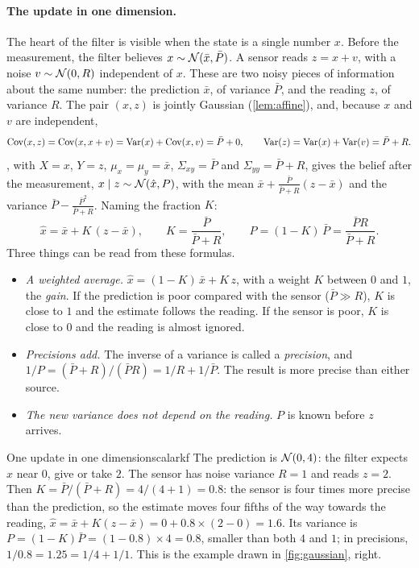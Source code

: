 \paragraph{The update in one dimension.} The heart of the filter is
visible when the state is a single number $x$. Before the measurement,
the filter believes $x\sim\mathcal{N}(\bar x,\bar P)$. A sensor reads
$z=x+v$, with a noise $v\sim\mathcal{N}(0,R)$ independent of $x$. These are two
noisy pieces of information about the same number: the prediction
$\bar x$, of variance $\bar P$, and the reading $z$, of variance $R$. The pair $(x,z)$ is jointly Gaussian (\cref{lem:affine}), and, because
$x$ and $v$ are independent,
\[
  \operatorname{Cov}(x,z)=\operatorname{Cov}(x,x+v)=\operatorname{Var}(x)+\operatorname{Cov}(x,v)=\bar P+0,\qquad
  \operatorname{Var}(z)=\operatorname{Var}(x)+\operatorname{Var}(v)=\bar P+R .
\]
, with $X=x$, $Y=z$, $\mu_x=\mu_y=\bar x$,
$\Sigma_{xy}=\bar P$ and $\Sigma_{yy}=\bar P+R$, gives the belief after the
measurement, $x\mid z\sim\mathcal{N}(\hat x,P)$, with the mean
$\bar x+\frac{\bar P}{\bar P+R}(z-\bar x)$ and the variance
$\bar P-\frac{\bar P^2}{\bar P+R}$. Naming the fraction $K$:
\begin{equation}\label{eq:scalarkf}
  \hat x=\bar x+K\,(z-\bar x),\qquad K=\frac{\bar P}{\bar P+R},\qquad
  P=(1-K)\,\bar P=\frac{\bar PR}{\bar P+R}.
\end{equation}
Three things can be read from these formulas.
\begin{itemize}[nosep]
  \item \emph{A weighted average.} $\hat x=(1-K)\,\bar x+K\,z$, with a
    weight $K$ between $0$ and $1$, the \emph{gain}. If the prediction is
    poor compared with the sensor ($\bar P\gg R$), $K$ is close to $1$ and
    the estimate follows the reading. If the sensor is poor, $K$ is close
    to $0$ and the reading is almost ignored.
  \item \emph{Precisions add.} The inverse of a variance is called a
    \emph{precision}, and
    $1/P=(\bar P+R)/(\bar PR)=1/R+1/\bar P$. The result is more precise
    than either source.
  \item \emph{The new variance does not depend on the reading.} $P$ is
    known before $z$ arrives.
\end{itemize}

\begin{example}{One update in one dimension}{scalarkf}
The prediction is $\mathcal{N}(0,4)$: the filter expects $x$ near $0$, give or
take $2$. The sensor has noise variance $R=1$ and reads $z=2$. Then $K=\bar P/(\bar P+R)=4/(4+1)=0.8$: the sensor is four times more
precise than the prediction, so the estimate moves four fifths of the way
towards the reading, $\hat x=\bar x+K(z-\bar x)=0+0.8\times(2-0)=1.6$. Its
variance is $P=(1-K)\bar P=(1-0.8)\times4=0.8$, smaller than both $4$ and
$1$; in precisions, $1/0.8=1.25=1/4+1/1$. This is the example drawn in \cref{fig:gaussian}, right.
\end{example}


